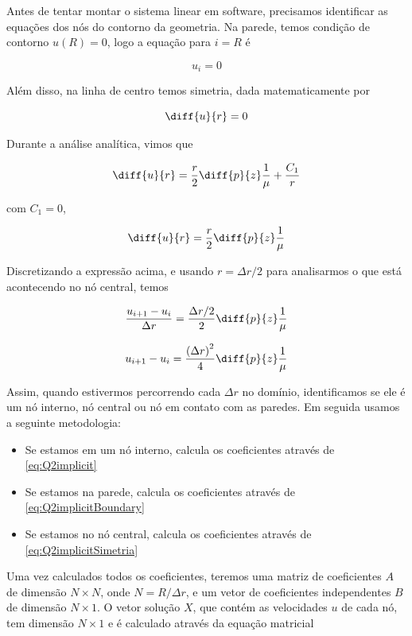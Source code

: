 Antes de tentar montar o sistema linear em software, precisamos identificar as equações dos nós do
contorno da geometria. Na parede, temos condição de contorno $u(R) = 0$, logo a equação para $i = R$ é

\begin{equation}\label{eq:Q2implicitBoundary}
    u_i = 0
\end{equation}

Além disso, na linha de centro temos simetria, dada matematicamente por

\[ \diff{u}{r} = 0 \]

Durante a análise analítica, vimos que

\[ \diff{u}{r} = \frac{r}{2} \diff{p}{z} \frac{1}{\mu} + \frac{C_1}{r} \]

\noindent com $C_1 = 0$,

\[ \diff{u}{r} = \frac{r}{2} \diff{p}{z} \frac{1}{\mu} \]

Discretizando a expressão acima, e usando $r = \Delta r / 2$ para analisarmos
o que está acontecendo no nó central, temos

\[ \frac{u_{i+1} - u_i}{\Delta r} = \frac{\Delta r / 2}{2} \diff{p}{z} \frac{1}{\mu} \]

\begin{equation}\label{eq:Q2implicitSimetria}
    u_{i+1} - u_i = \frac{\left(\Delta r\right)^2}{4} \diff{p}{z} \frac{1}{\mu}
\end{equation}

Assim, quando estivermos percorrendo cada $\Delta r$ no domínio, identificamos se ele é um nó interno, nó central ou
nó em contato com as paredes. Em seguida usamos a seguinte metodologia:

\begin{itemize}
    \item Se estamos em um nó interno, calcula os coeficientes através de \eqref{eq:Q2implicit}
    \item Se estamos na parede, calcula os coeficientes através de \eqref{eq:Q2implicitBoundary}
    \item Se estamos no nó central, calcula os coeficientes através de \eqref{eq:Q2implicitSimetria}
\end{itemize}

Uma vez calculados todos os coeficientes, teremos uma matriz de coeficientes $A$ de dimensão $N \times N$, onde
$N = R / \Delta r$, e um vetor de coeficientes independentes $B$ de dimensão $N \times 1$.
O vetor solução $X$, que contém as velocidades $u$ de cada nó, tem dimensão $N \times 1$ e é calculado através da
equação matricial

